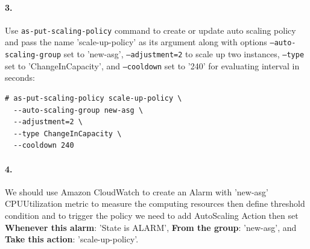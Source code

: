 \documentclass[a4paper]{article}
\begin{document}
\paragraph{3. } Use \texttt{as-put-scaling-policy} command to create or update auto scaling policy and pass the name 'scale-up-policy' as its argument along with options \texttt{--auto-scaling-group} set to 'new-asg', \texttt{--adjustment=2} to scale up two instances, \texttt{--type} set to 'ChangeInCapacity', and \texttt{--cooldown} set to '240' for evaluating interval in seconds:

\begin{verbatim}
# as-put-scaling-policy scale-up-policy \
  --auto-scaling-group new-asg \
  --adjustment=2 \
  --type ChangeInCapacity \
  --cooldown 240
\end{verbatim}

\paragraph{4. } We should use Amazon CloudWatch to create an Alarm with 'new-asg' CPUUtilization metric to measure the computing resources then define threshold condition and to trigger the policy we need to add AutoScaling Action then set \textbf{Whenever this alarm}: 'State is ALARM', \textbf{From the group}: 'new-asg', and \textbf{Take this action}: 'scale-up-policy'.

\end{document}
